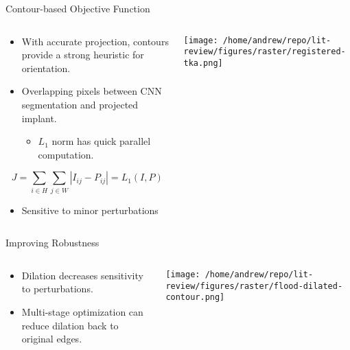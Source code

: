 \documentclass[presentation, aspectratio=1610]{beamer}
\begin{document}
\begin{frame}[label={sec:orga52fcb5}]{Contour-based Objective Function}
\begin{columns}
\begin{column}{0.5\columnwidth}
\begin{itemize}
\item With accurate projection, contours provide a strong heuristic for orientation.
\item Overlapping pixels between CNN segmentation and projected implant.
\begin{itemize}
\item \(L_1\) norm has quick parallel computation.
\end{itemize}
\end{itemize}

\begin{equation*}
  J = \sum_{i \in H}\sum_{j \in W}|I_{ij} - P_{ij}| = L_{1}(I,P)
\end{equation*}

\begin{itemize}
\item Sensitive to minor perturbations
\end{itemize}
\end{column}
\begin{column}{0.6\columnwidth}
\begin{center}
\texttt{[image: /home/andrew/repo/lit-review/figures/raster/registered-tka.png]}
\end{center}
\end{column}
\end{columns}
\end{frame}
\begin{frame}[label={sec:org6912669}]{Improving Robustness}
\begin{columns}
\begin{column}{0.5\columnwidth}
\begin{itemize}
\item Dilation decreases sensitivity to perturbations.
\item Multi-stage optimization can reduce dilation back to original edges.
\end{itemize}
\end{column}
\begin{column}{0.6\columnwidth}
\begin{center}
\texttt{[image: /home/andrew/repo/lit-review/figures/raster/flood-dilated-contour.png]}
\end{center}
\end{column}
\end{columns}
\end{frame}
\end{document}
